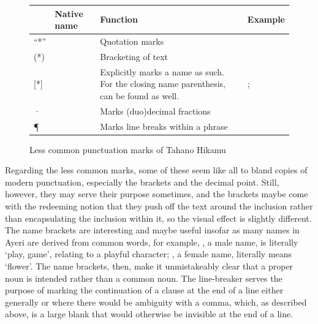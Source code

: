 \begin{figure}[htp]
\caption{Less common punctuation marks of Tahano Hikamu}
\begin{tabu} to 
\toprule
\tableheaderfont

	& Native name
	& Function
	& Example
	\\
	
\toprule

“*”
	& 
	& Quotation marks
	& 
	\\
	
\midrule

(*)
	& 
	& Bracketing of text
	& 
	\\

\midrule

[*]
	& 
	& Explicitly marks a name as such. For the closing name parenthesis, 
		 can be found as well.
	& ; 
	\\
	
\midrule

·
	& 
	& Marks (duo)decimal fractions
	& 
	\\
	
\midrule

¶
	& 
	& Marks line breaks within a phrase
	& 
	\\

\bottomrule
\end{tabu}
\label{fig:thpunctuncom}
\end{figure}

Regarding the less common marks, some of these seem like all to bland copies of 
modern punctuation, especially the brackets and the decimal point. Still, 
however, they may serve their purpose sometimes, and the brackets \ayr{(*)} 
maybe come with the redeeming notion that they push off the text around the 
inclusion rather than encapsulating the inclusion within it, so the visual 
effect is slightly different. The name brackets \ayr{[*]} are interesting and 
maybe useful insofar as many names in Ayeri are derived from common words, for 
example, , a male name, is literally `play, game', relating 
to a playful character; , a female name, literally means 
`flower'. The name brackets, then, make it unmistakeably clear that a proper 
noun is intended rather than a common noun. The line-breaker  serves the 
purpose of marking the continuation of a clause at the end of a line either 
generally or where there would be ambiguity with a comma, which, as described 
above, is a large blank that would otherwise be invisible at the end of a line.

